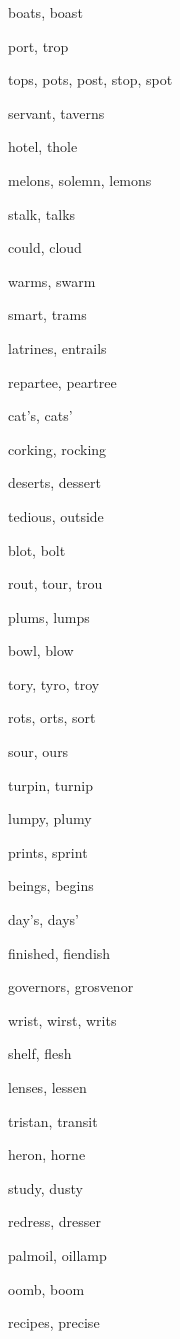     \item boats, boast
    \item port, trop
    \item tops, pots, post, stop, spot
    \item servant, taverns
    \item hotel, thole
    \item melons, solemn, lemons
    \item stalk, talks
    \item could, cloud
    \item warms, swarm
    \item smart, trams
    \item latrines, entrails
    \item repartee, peartree
    \item cat's, cats'
    \item corking, rocking
    \item deserts, dessert
    \item tedious, outside
    \item blot, bolt
    \item rout, tour, trou
    \item plums, lumps
    \item bowl, blow
    \item tory, tyro, troy
    \item rots, orts, sort
    \item sour, ours
    \item turpin, turnip
    \item lumpy, plumy
    \item prints, sprint
    \item beings, begins
    \item day's, days'
    \item finished, fiendish
    \item governors, grosvenor
    \item wrist, wirst, writs
    \item shelf, flesh
    \item lenses, lessen
    \item tristan, transit
    \item heron, horne
    \item study, dusty
    \item redress, dresser
    \item palmoil, oillamp
    \item oomb, boom
    \item recipes, precise
